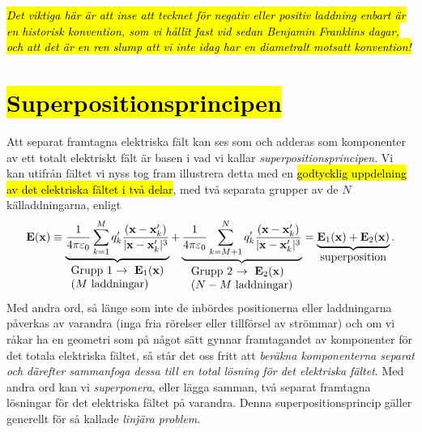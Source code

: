 {{\hl{\it Det viktiga h{\"a}r {\"a}r att inse att tecknet f{\"o}r negativ
eller positiv laddning enbart {\"a}r en historisk konvention, som vi
h{\aa}llit fast vid sedan Benjamin Franklins dagar, och att det {\"a}r en
ren slump att vi inte idag har en diametralt motsatt konvention!}}
\vfill\eject

\section{\hl{Superpositionsprincipen}}
Att separat framtagna elektriska f{\"a}lt kan ses som och adderas som
komponenter av ett totalt elektriskt f{\"a}lt {\"a}r basen i vad vi kallar
{\it superpositionsprincipen}.
Vi kan utifr{\aa}n f{\"a}ltet vi nyss tog fram illustrera detta med en
{\hl{godtycklig uppdelning av det elektriska f{\"a}ltet i tv{\aa} delar}},
med tv{\aa} separata grupper av de $N$ k{\"a}lladdningarna,
 enligt
\hl{$$
  {\bf E}({\bf x})\equiv
  \underbrace{
    {{1}\over{4\pi\varepsilon_0}}\sum^M_{k=1}
    q'_k {{({\bf x}-{\bf x}'_k)}\over{|{\bf x}-{\bf x}'_k|^3}}
  }_{\vbox{\hbox{Grupp 1 $\rightarrow\ {\bf E}_1({\bf x})$}\hbox{($M$ laddningar)}}}
  +\underbrace{
     {{1}\over{4\pi\varepsilon_0}}\sum^{N}_{k=M+1}
     q'_k {{({\bf x}-{\bf x}'_k)}\over{|{\bf x}-{\bf x}'_k|^3}}
   }_{\vbox{\hbox{Grupp 2 $\rightarrow\ {\bf E}_2({\bf x})$}\hbox{($N-M$ laddningar)}}}
   =\underbrace{{\bf E}_1({\bf x})+{\bf E}_2({\bf x})}_{\hbox{superposition}}.
$$}
\noindent
Med andra ord, s{\aa} l{\"a}nge som inte de inb{\"o}rdes positionerna eller
laddningarna p{\aa}verkas av varandra (inga fria r{\"o}relser eller
tillf{\"o}rsel av str{\"o}mmar) och om vi r{\aa}kar ha en geometri som
p{\aa} n{\aa}got s{\"a}tt gynnar framtagandet av komponenter f{\"o}r det
totala elektriska f{\"a}ltet, s{\aa} st{\aa}r det oss fritt att {\it ber{\"a}kna
komponenterna separat och d{\"a}refter sammanfoga dessa till en total
l{\"o}sning f{\"o}r det elektriska f{\"a}ltet}.
Med andra ord kan vi {\it superponera}, eller {l{\"a}gga samman}, tv{\aa}
separat framtagna l{\"o}sningar f{\"o}r det elektriska f{\"a}ltet p{\aa}
varandra.
Denna superpositionsprincip g{\"a}ller generellt f{\"o}r s{\aa} kallade
{\it linj{\"a}ra problem}.

}
